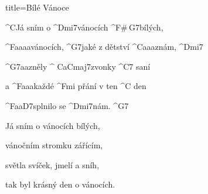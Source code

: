 \begin{song}{title=\predtitle\centering Bílé Vánoce \\\large   \vspace*{-0.3cm}}  %
\begin{centerjustified}
\nejnejvetsi

\sloka 
	^{C}Já sním o ^{Dmi7}vánocích ^{F\#\,G7}bílých,

	^{F{\color{white}aaaa}}vánocích, ^{G7}jaké z dětství ^{C{\color{white}aaa}}znám, ^{Dmi7}

	^{G7{\color{white}aa}}zněly ^{\,\,C{\color{white}a}Cmaj7}zvonky ^{C7\,\,}saní

	a ^{F{\color{white}aaa}}každé ^{Fmi\,\,}přání v ten ^{C\,\,}den

	^{F{\color{white}aa}D7}splnilo se ^{Dmi7}nám. ^{G7}

\sloka
	Já sním o vánocích bílých,

	vánočním stromku zářícím,

	světla svíček, jmelí a sníh,

	tak byl krásný den o vánocích.



\end{centerjustified}
\setcounter{Slokočet}{0}
\end{song}

